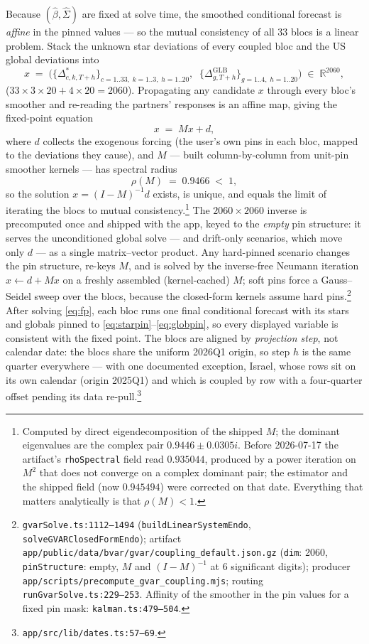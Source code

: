 \documentclass[11pt]{article}
\newcommand{\code}[1]{\texttt{\small #1}}
\begin{document}
Because $(\hat\beta, \hat\Sigma)$ are fixed at solve time, the smoothed conditional forecast is
\emph{affine} in the pinned values --- so the mutual consistency of all 33 blocs is a linear
problem. Stack the unknown star deviations of every coupled bloc and the US global deviations
into
\[
  x \;=\; \Big( \big\{\Delta^{*}_{c,k,T+h}\big\}_{c=1..33,\;k=1..3,\;h=1..20},\;\;
                \big\{\Delta^{\mathrm{GLB}}_{g,T+h}\big\}_{g=1..4,\;h=1..20} \Big)
  \;\in\; \mathbb{R}^{2060},
\]
($33\times3\times20 + 4\times20 = 2060$). Propagating any candidate $x$ through every bloc's
smoother and re-reading the partners' responses is an affine map, giving the fixed-point equation
\begin{equation}\label{eq:fp}
  x \;=\; M x + d,
\end{equation}
where $d$ collects the exogenous forcing (the user's own pins in each bloc, mapped to the
deviations they cause), and $M$ --- built column-by-column from unit-pin smoother kernels --- has
spectral radius
\begin{equation}\label{eq:rho}
  \rho(M) \;=\; 0.9466 \;<\; 1,
\end{equation}
so the solution $x = (I - M)^{-1} d$ exists, is unique, and equals the limit of iterating the
blocs to mutual consistency.\footnote{Computed by direct eigendecomposition of the shipped $M$;
the dominant eigenvalues are the complex pair $0.9446 \pm 0.0305i$. Before 2026-07-17 the
artifact's \code{rhoSpectral} field read $0.935044$, produced by a power iteration on $M^2$ that
does not converge on a complex dominant pair; the estimator and the shipped field (now
$0.945494$) were corrected on that date. Everything that matters analytically is that
$\rho(M) < 1$.} The $2060\times2060$ inverse is
precomputed once and shipped with the app, keyed to the \emph{empty} pin structure: it serves the
unconditioned global solve --- and drift-only scenarios, which move only $d$ --- as a single
matrix--vector product. Any hard-pinned scenario changes the pin structure, re-keys $M$, and is
solved by the inverse-free Neumann iteration $x \leftarrow d + Mx$ on a freshly assembled
(kernel-cached) $M$; soft pins force a Gauss--Seidel sweep over the blocs, because the closed-form
kernels assume hard pins.\footnote{\code{gvarSolve.ts:1112--1494} (\code{buildLinearSystemEndo},
\code{solveGVARClosedFormEndo}); artifact
\code{app/public/data/bvar/gvar/coupling\_default.json.gz} (\code{dim}: 2060, \code{pinStructure}:
empty, $M$ and $(I-M)^{-1}$ at 6 significant digits); producer
\code{app/scripts/precompute\_gvar\_coupling.mjs}; routing \code{runGvarSolve.ts:229--253}.
Affinity of the smoother in the pin values for a fixed pin mask: \code{kalman.ts:479--504}.}
After solving \eqref{eq:fp}, each bloc runs one final conditional forecast with its stars and
globals pinned to \eqref{eq:starpin}--\eqref{eq:globpin}, so every displayed variable is
consistent with the fixed point. The blocs are aligned by \emph{projection step}, not calendar
date: the blocs share the uniform 2026Q1 origin, so step $h$ is the same quarter everywhere ---
with one documented exception, Israel, whose rows sit on its own calendar (origin 2025Q1) and
which is coupled by row with a four-quarter offset pending its data
re-pull.\footnote{\code{app/src/lib/dates.ts:57--69}.}
\end{document}
